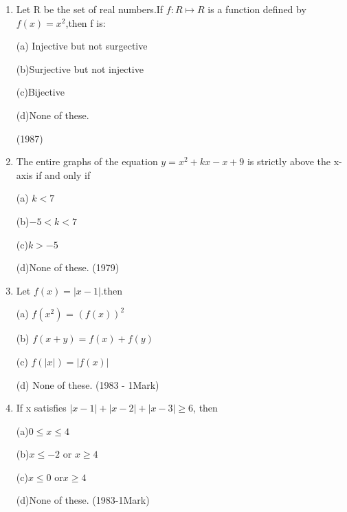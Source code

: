 \documentclass[journal,12pt,twocolumn]{IEEEtran}
\theoremstyle{remark}
\begin{document}
\begin{enumerate}
 




\item Let R be the set of real numbers.If $f:R \mapsto R $ is
a function defined by$f(x)= x^2 $,then f is:


    


    

 (a) Injective but not surgective 
 
 (b)Surjective but not injective
 
 (c)Bijective
 
 (d)None of these.

\hfill
(1987)


 


\item The entire graphs of the equation $y= x{^2}+ kx - x +9$ is strictly above the x-axis 
if and only if


 (a) $k<7$
 
 (b)$-5<k<7$
 
 (c)$k>-5$
 
 (d)None of these.
 \hfill
 (1979)


\item Let $f(x)=|x-1|.$then


  (a) $f(x^2)$ = $(f(x))^2$

  (b) $f(x+y)=f(x)+f(y)$

  (c) $f(|x|)=|f(x)|$

  (d) None of these.
  \hfill
  (1983 - 1Mark)




  \item If x satisfies $|x-1| + |x-2| + |x-3|\geq6$, then


  (a)$0\leq x\leq4$
  
  (b)$x \leq-2$ or $x\geq4$
  
  (c)$x\leq0$ or$x\geq4$
  
  (d)None of these.
  \hfill
  (1983-1Mark)
  

\end{enumerate}
\end{document}
